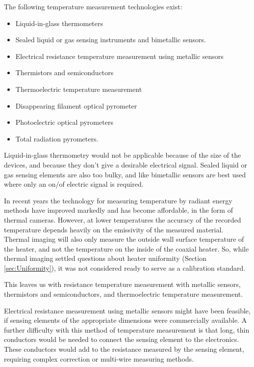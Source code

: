 The following temperature measurement technologies exist:
\begin{itemize}
	\item Liquid-in-glass thermometers
	\item Sealed liquid or gas sensing instruments and bimetallic sensors.
	\item Electrical resistance temperature measurement using metallic sensors
	\item Thermistors and semiconductors
	\item Thermoelectric temperature measurement
	\item Disappearing filament optical pyrometer
	\item Photoelectric optical pyrometers
	\item Total radiation pyrometers.
\end{itemize}

Liquid-in-glass thermometry would not be applicable because of the size of the
devices, and because they don't give a desirable electrical signal. Sealed
liquid or gas sensing elements are also too bulky, and like bimetallic sensors
are best used where only an on/of electric signal is required.

In recent years the technology for measuring temperature by radiant energy
methods have improved markedly and has become affordable, in the form of thermal
cameras. However, at lower temperatures the accuracy of the recorded temperature
depends heavily on the emissivity of the measured material. Thermal imaging will
also only measure the outside wall surface temperature of the heater, and not
the temperature on the inside of the coaxial heater. So, while thermal imaging
settled questions about heater uniformity (Section \ref{sec:Uniformity}), it was
not considered ready to serve as a calibration standard. 

This leaves us with resistance temperature measurement with metallic sensors,
thermistors and semiconductors, and thermoelectric temperature measurement.

Electrical resistance measurement using metallic sensors might have been
feasible, if sensing elements of the appropriate dimensions were commercially
available. A further difficulty with this method of temperature measurement is
that long, thin conductors would be needed to connect the sensing element to the
electronics. These conductors would add to the resistance measured by the
sensing element, requiring complex correction or multi-wire measuring methods.

